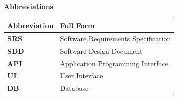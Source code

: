 
\newpage
\thispagestyle{plain}

\begin{center}
\textbf{\LARGE Abbreviations}
\end{center}

\vspace{1cm}

\begin{table}[htbp]
\centering
\renewcommand{\arraystretch}{1.4}
\begin{tabularx}{\textwidth}{|p{3cm}|X|}
\hline
\textbf{Abbreviation} & \textbf{Full Form} \\
\hline
\textbf{SRS} & Software Requirements Specification \\ \hline
\textbf{SDD} & Software Design Document \\ \hline
\textbf{API} & Application Programming Interface \\ \hline
\textbf{UI} & User Interface \\ \hline
\textbf{DB} & Database \\ \hline
\end{tabularx}
\end{table}

\newpage
